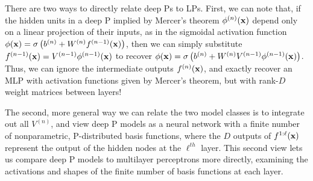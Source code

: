 \documentclass[twoside]{article}
\makeatletter
\newlength{\nonHumbleHeight}
\def\@humbleformat#1{{\settoheight{\nonHumbleHeight}{#1}\resizebox{!}{0.94\nonHumbleHeight}{#1}}}%
\def\humble#1{\@humbleformat{#1}}%
\newcommand{\gp}{{\humble GP}}
\newcommand{\MLP}{{\humble MLP}}
\makeatother
\begin{document}
There are two ways to directly relate deep \gp{}s to \MLP{}s.  First, we can note that, if the hidden units in a deep \gp{} implied by Mercer's theorem $\phi^{(n)}({\bf{x}})$ depend only on a linear projection of their inputs, as in the sigmoidal activation function $\phi({\bf{x}}) = \sigma \left( b^{(n)} + W^{(n)}f^{(n-1)}({\bf{x}}) \right)$, then we can simply substitute $f^{(n-1)}({\bf{x}}) = V^{(n-1)} \phi^{(n-1)}({\bf{x}})$ to recover $\phi({\bf{x}}) = \sigma \left( b^{(n)} + W^{(n)} V^{(n-1)} \phi^{(n-1)}({\bf{x}}) \right)$.  Thus, we can ignore the intermediate outputs $f^{(n)}({\bf{x}})$, and exactly recover an MLP with activation functions given by Mercer's theorem, but with rank-$D$ weight matrices 
 between layers!

The second, more general way we can relate the two model classes is to integrate out all $V^{(n)}$, and view deep \gp{} models as a neural network with a finite number of nonparametric, \gp{}-distributed basis functions, where the $D$ outputs of $f^{1:\ell}({\bf{x}})$ represent the output of the hidden nodes at the $\ell^{th}$ layer.
%
This second view lets us compare deep \gp{} models to multilayer perceptrons more directly, examining the activations and shapes of the finite number of basis functions at each layer.

%
%






\end{document}
